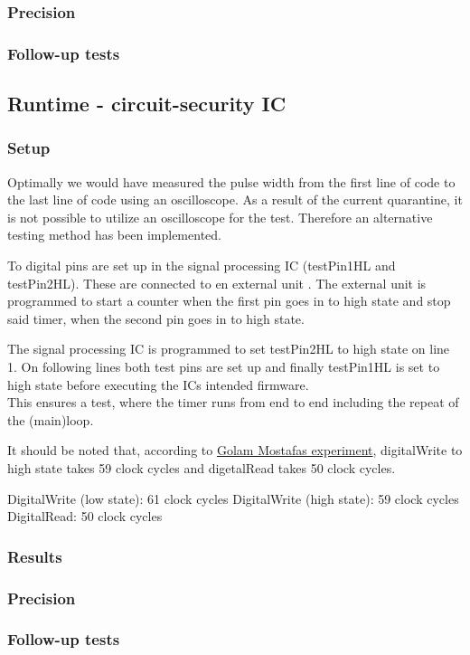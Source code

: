 \subsubsection{Precision}

\subsubsection{Follow-up tests}



\subsection{Runtime - circuit-security IC}

\subsubsection{Setup}
Optimally we would have measured the pulse width from the first line of code to the last line of code using an oscilloscope. As a result of the current quarantine, it is not possible to utilize an oscilloscope for the test. Therefore an alternative testing method has been implemented.

To digital pins are set up in the signal processing IC (testPin1HL and testPin2HL). These are connected to en external unit . The external unit is programmed to start a counter when the first pin goes in to high state and stop said timer, when the second pin goes in to high state.

The signal processing IC is programmed to set testPin2HL to high state on line 1. On following lines both test pins are set up and finally testPin1HL is set to high state before executing the ICs intended firmware.\\
This ensures a test, where the timer runs from end to end including the repeat of the (main)loop.

It should be noted that, according to \hyperlink{AppA}{Golam Mostafas experiment}, digitalWrite to high state takes 59 clock cycles and digetalRead takes 50 clock cycles.


DigitalWrite (low state): 61 clock cycles
DigitalWrite (high state): 59 clock cycles
DigitalRead: 50 clock cycles




\subsubsection{Results}

\subsubsection{Precision}

\subsubsection{Follow-up tests}

